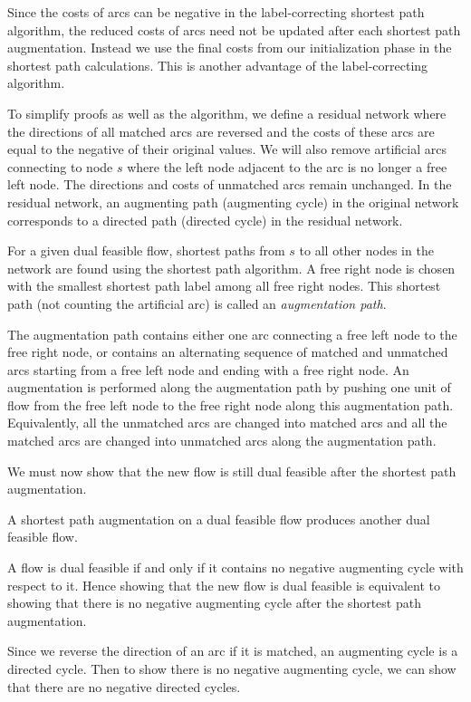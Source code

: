 Since the costs of arcs can
be negative in the label-correcting shortest path algorithm, the
reduced costs of arcs need not be updated after each shortest path
augmentation. Instead we use the final costs from our initialization
phase in the shortest path calculations.  This is another advantage of
the label-correcting algorithm.

To simplify proofs as well as the algorithm, we define a residual
network where the directions of all matched arcs are reversed and the
costs of these arcs are equal to the negative of their original
values.  We will also remove artificial arcs connecting to node $s$
where the left node adjacent to the arc is no longer a free left node.
The directions and costs of unmatched arcs remain unchanged.
In the residual network, an augmenting path (augmenting cycle) in the
original network corresponds to a directed path (directed cycle) in
the residual network.

For a given dual feasible flow, shortest paths from $s$ to all other
nodes in the network are found using the shortest path
algorithm.
A free right node is chosen with the smallest shortest path
label among all free right nodes. This shortest path (not counting the
artificial arc) is called an {\it augmentation path}.

The augmentation path contains either one arc connecting a free left
node to the free right node, or contains an alternating sequence of
matched and unmatched arcs starting from a free left node and ending
with a free right node. An augmentation is performed along the
augmentation path by pushing one unit of flow from the free left node
to the free right node along this augmentation path. Equivalently, all
the unmatched arcs are changed into matched arcs and all the matched
arcs are changed into unmatched arcs along the augmentation path.

We must now show that the new flow is still dual feasible after the
shortest path augmentation.

 A shortest path augmentation on a dual
feasible flow produces another dual feasible flow.

\proof A flow is dual feasible if and only if it contains no negative
augmenting cycle with respect to it. Hence showing that the new flow
is dual feasible is equivalent to showing that there is no negative
augmenting cycle after the shortest path augmentation.

Since we reverse the direction of an arc if it is matched, an
augmenting cycle is a directed cycle.  Then to show there is no
negative augmenting cycle, we can show that there are no negative
directed cycles.

